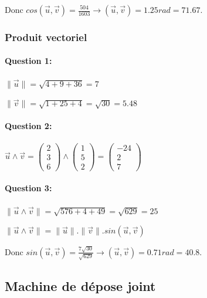 Donc $cos(\overrightarrow{u},\overrightarrow{v})=\frac{504}{1603}\rightarrow (\overrightarrow{u},\overrightarrow{v})=1.25rad=71.67$\textdegree.

\subsubsection{Produit vectoriel}

\paragraph{Question 1:} $\|\overrightarrow{u}\|=\sqrt{4+9+36}=7$

$\|\overrightarrow{v}\|=\sqrt{1+25+4}=\sqrt{30}=5.48$

\paragraph{Question 2:} $\overrightarrow{u}\wedge \overrightarrow{v}=\left(\begin{array}{c} 2 \\ 3 \\ 6 \end{array}\right)\wedge 
\left(\begin{array}{c} 1 \\ 5 \\ 2 \end{array}\right)=\left(\begin{array}{c} -24 \\ 2 \\ 7 \end{array}\right)$

\paragraph{Question 3:} $\|\overrightarrow{u}\wedge \overrightarrow{v}\|=\sqrt{576+4+49}=\sqrt{629}=25$

$\|\overrightarrow{u}\wedge \overrightarrow{v}\|=\|\overrightarrow{u}\|.\|\overrightarrow{v}\|.sin(\overrightarrow{u},\overrightarrow{v})$

Donc $sin(\overrightarrow{u},\overrightarrow{v})=\frac{7\sqrt{30}}{\sqrt{629}}\rightarrow (\overrightarrow{u},\overrightarrow{v})=0.71rad=40.8$\textdegree.

\newpage

\subsection{Machine de dépose joint}

